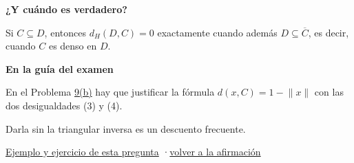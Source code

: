 \documentclass[11pt,a4paper]{article}
\newcommand{\cl}[1]{\overline{#1}}\newcommand{\norm}[1]{\lVert #1\rVert}\newcommand{\abs}[1]{\lvert #1\rvert}
\newcommand{\bloque}[1]{\par\smallskip\noindent\textbf{\color{acento}#1}\par}
\begin{document}
\bloque{¿Y cuándo es verdadero?}
\begin{pasos}
\item[] Si $C\subseteq D$, entonces $d_H(D,C)=0$ exactamente cuando además $D\subseteq\cl C$, es decir, cuando $C$ es denso en $D$.
\end{pasos}
\bloque{En la guía del examen}
\begin{pasos}
\item[] En el Problema \hyperlink{prob-9}{9(b)} hay que justificar la fórmula $d(x,C)=1-\norm x$ con las dos desigualdades (3) y (4).
\item[] Darla sin la triangular inversa es un descuento frecuente.
\end{pasos}
\par{}
\par{\small \hyperlink{e-8}{Ejemplo y ejercicio de esta pregunta} \quad·\quad \hyperlink{q-8}{volver a la afirmación}}
\end{document}
